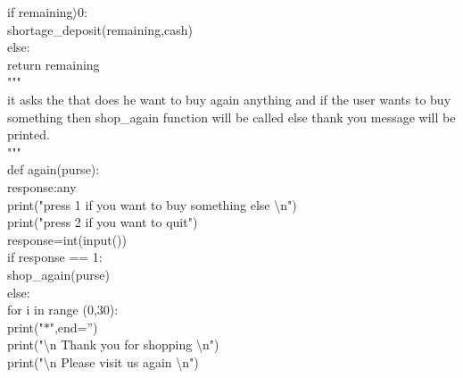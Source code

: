 \documentclass[10pt,a4paper]{article}
\begin{document}
\begin{flushleft}
\hspace*{0.5cm}   if remaining$\rangle$0:\\
\hspace*{0.5cm}\hspace*{0.5cm}        shortage\_deposit(remaining,cash)\\
\hspace*{0.5cm}    else:\\
\hspace*{0.5cm}\hspace*{0.5cm}        return remaining\\
\bigskip        
"""\\
it asks the that does he want to buy again anything and if the user wants to buy something then shop\_again 
function will be called else thank you message will be printed.\\
"""\\ 
def again(purse):\\
\hspace*{0.5cm}    response:any\\
\hspace*{0.5cm}    print("press 1 if you want to buy something else \textbackslash n")\\
\hspace*{0.5cm}    print("press 2 if you want to quit")\\
\hspace*{0.5cm}    response=int(input())\\
\hspace*{0.5cm}    if response == 1:\\
\hspace*{0.5cm}\hspace*{0.5cm}        shop\_again(purse)\\
\hspace*{0.5cm}    else:\\
\hspace*{0.5cm}\hspace*{0.5cm}        for i in range (0,30):\\
\hspace*{0.5cm}\hspace*{0.5cm}\hspace*{0.5cm}            print("$\ast$",end='')\\
\hspace*{0.5cm}\hspace*{0.5cm}        print("\textbackslash n Thank you for shopping \textbackslash n")\\
\hspace*{0.5cm}\hspace*{0.5cm}        print("\textbackslash n Please visit us again \textbackslash n")\\

\end{flushleft}
\end{document}
